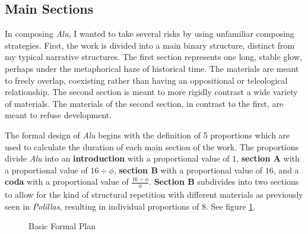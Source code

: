 \subsection{Main Sections}

In composing \textit{Alu,} I wanted to take several risks by using unfamiliar composing strategies. First, the work is divided into a main binary structure, distinct from my typical narrative structures. The first section represents one long, stable glow, perhaps under the metaphorical haze of historical time. The materials are meant to freely overlap, coexisting rather than having an oppositional or teleological relationship. The second section is meant to more rigidly contrast a wide variety of materials. The materials of the second section, in contrast to the first, are meant to refuse development.

The formal design of \textit{Alu} begins with the definition of 5 proportions which are used to calculate the duration of each main section of the work. The proportions divide \textit{Alu} into an \textbf{introduction} with a proportional value of $1$, \textbf{section A} with a proportional value of $16 \div ϕ$, \textbf{section B} with a proportional value of $16$, and a \textbf{coda} with a proportional value of $\frac{16 \div ϕ}{ϕ}$. \textbf{Section B} subdivides into two sections to allow for the kind of structural repetition with different materials as previously seen in \textit{Polillas}, resulting in individual proportions of $8$. See figure \ref{fig:main-sections}.

\begin{figure}[p]
    \centering
    \caption{Basic Formal Plan}
    \label{fig:main-sections}
\end{figure}

